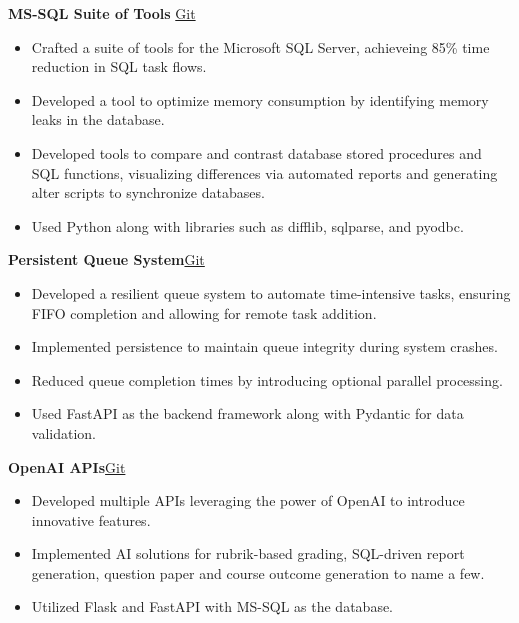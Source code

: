 \documentclass[a4paper]{article}
\begin{document}
{\textbf{MS-SQL Suite of Tools }}\hfill \href{https://github.com/swarnimcodes/Sequel}{Git}\\
\begin{itemize} %
    \item Crafted a suite of tools for the Microsoft SQL Server, achieveing
    85\% time reduction in SQL task flows. \\
    \item Developed a tool to optimize memory consumption by identifying memory leaks in the database. \\
    \item Developed tools to compare and contrast database stored procedures and SQL functions,
    visualizing differences via automated reports and generating alter scripts to synchronize databases. \\
    \item Used Python along with libraries such as difflib, sqlparse, and pyodbc. \\
\end{itemize}
\vspace*{2mm}

{\textbf{Persistent Queue System}}\hfill \href{https://github.com/swarnimcodes/kafkaesqueue}{Git}\\
\begin{itemize} 
    \item Developed a resilient queue system to automate time-intensive tasks,
    ensuring FIFO completion and allowing for remote task addition. \\
    \item Implemented persistence to maintain queue integrity during system crashes. \\
    \item Reduced queue completion times by introducing optional parallel processing. \\
    \item Used FastAPI as the backend framework along with Pydantic for data validation. \\
\end{itemize}

\vspace*{2mm}

{\textbf{OpenAI APIs}}\hfill \href{https://github.com/swarnimcodes/openai-gen-co-and-qp}{Git}\\
\begin{itemize} 
    \item Developed multiple APIs leveraging the power of OpenAI to introduce
    innovative features.
    \item Implemented AI solutions for rubrik-based grading, SQL-driven report generation,
    question paper and course outcome generation to name a few. \\
    \item Utilized Flask and FastAPI with MS-SQL as the database. \\
\end{itemize}
\vspace*{2mm}
\end{document}

